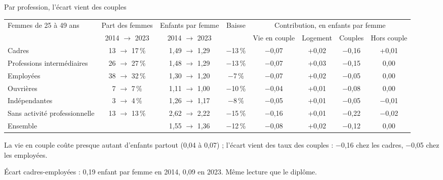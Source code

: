 \documentclass[10pt,aspectratio=169]{beamer}
\begin{document}
\begin{frame}{Par profession, l'écart vient des couples}
  \centering\scriptsize\setlength{\tabcolsep}{4pt}
  \begin{tabular}{@{}lccccccc@{}}
    \toprule
    Femmes de 25 à 49 ans & Part des femmes & Enfants par femme & Baisse & \multicolumn{4}{c}{Contribution, en enfants par femme} \\
    \cmidrule(l){5-8}
     & 2014 $\to$ 2023 & 2014 $\to$ 2023 & & Vie en couple & Logement & Couples & Hors couple \\
    \midrule
    Cadres & 13 $\to$ 17\,\% & 1,49 $\to$ 1,29 & $-$13\,\% & $-$0,07 & +0,02 & $-$0,16 & +0,01 \\
    Professions intermédiaires & 26 $\to$ 27\,\% & 1,48 $\to$ 1,29 & $-$13\,\% & $-$0,07 & +0,03 & $-$0,15 & 0,00 \\
    Employées & 38 $\to$ 32\,\% & 1,30 $\to$ 1,20 & $-$7\,\% & $-$0,07 & +0,02 & $-$0,05 & 0,00 \\
    Ouvrières & 7 $\to$ 7\,\% & 1,11 $\to$ 1,00 & $-$10\,\% & $-$0,04 & +0,01 & $-$0,08 & 0,00 \\
    Indépendantes & 3 $\to$ 4\,\% & 1,26 $\to$ 1,17 & $-$8\,\% & $-$0,05 & +0,01 & $-$0,05 & $-$0,01 \\
    Sans activité professionnelle & 13 $\to$ 13\,\% & 2,62 $\to$ 2,22 & $-$15\,\% & $-$0,16 & +0,01 & $-$0,22 & $-$0,02 \\
    \midrule
    Ensemble & & 1,55 $\to$ 1,36 & $-$12\,\% & $-$0,08 & +0,02 & $-$0,12 & 0,00 \\
    \bottomrule
  \end{tabular}
  \vspace{0.3cm}

  \raggedright\small
  \begin{aere}
    \item La vie en couple coûte presque autant d'enfants partout (0,04 à 0,07) ; l'écart vient des \alert{taux des couples} : $-$0,16 chez les cadres, $-$0,05 chez les employées.
    \item Écart cadres-employées : 0,19 enfant par femme en 2014, 0,09 en 2023. Même lecture que le diplôme.
  \end{aere}
\end{frame}
\end{document}
